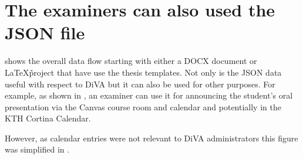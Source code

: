 \section{The examiners can also used the JSON file}

 shows the overall data flow starting with either a DOCX document or \LaTeX\~project that have use the thesis templates. Not only is the JSON data useful with respect to DiVA but it can also be used for other purposes. For example, as shown in , an examiner can use it for announcing the student's oral presentation via the Canvas course room and calendar and potentially in the KTH Cortina Calendar.

However, as calendar entries were not relevant to DiVA administrators this figure was simplified in .

